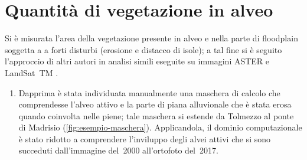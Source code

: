 \documentclass[12pt,a4paper,italian,twoside]{scrbook}
\begin{document}
\section{Quantità di vegetazione in alveo}
Si è misurata l'area della vegetazione presente in alveo e nella parte di floodplain soggetta a a forti disturbi (erosione e distacco di isole); 
a tal fine si è seguito l'approccio di altri autori in analisi simili eseguite su immagini ASTER e LandSat~TM \parencites{Bertoldi:2011-ASTER}{Henshaw:2013-LandSat}.
%
\begin{enumerate}
	\item Dapprima è stata individuata manualmente una maschera di calcolo che comprendesse l'alveo attivo e la parte di piana alluvionale che è stata erosa quando coinvolta nelle piene; 
	tale maschera si estende da Tolmezzo al ponte di Madrisio
	(\vref{fig:esempio-maschera}). 
	Applicandola, il dominio computazionale è stato ridotto a comprendere l'inviluppo degli alvei attivi che si sono succeduti dall'immagine del~2000 all'ortofoto del~2017.
	\begin{figure}[t]
		\centering
		\begin{subfigure}[b]{0.296\textwidth}

\end{subfigure}
\end{figure}
\end{enumerate}
\end{document}

